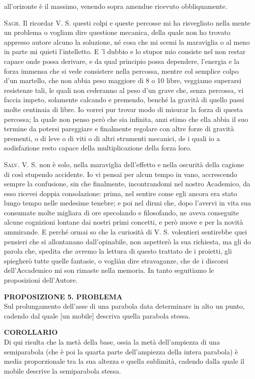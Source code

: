 \documentclass[11pt,twoside,openany]{book}
\newcommand{\speaker}[1]{\textcolor{rubric}{\textsc{#1}}\space}
\begin{document}
all'orizonte è il massimo, venendo sopra amendue ricevuto obbliquamente.

\speaker{Sagr.} Il ricordar V. S. questi colpi e queste percosse mi ha risvegliato nella mente un problema o vogliam dire questione mecanica, della quale non ho trovato appresso autore alcuno la soluzione, né cosa che mi scemi la maraviglia o al meno in parte mi quieti l'intelletto. E 'l dubbio e lo stupor mio consiste nel non restar capace onde possa derivare, e da qual principio possa dependere, l'energia e la forza immensa che si vede consistere nella percossa, mentre col semplice colpo d'un martello, che non abbia peso maggiore di 8 o 10 libre, veggiamo superarsi resistenze tali, le quali non cederanno al peso d'un grave che, senza percossa, vi faccia impeto, solamente calcando e premendo, benché la gravità di quello passi molte centinaia di libre. Io vorrei pur trovar modo di misurar la forza di questa percossa; la quale non penso però che sia infinita, anzi stimo che ella abbia il suo termine da potersi pareggiare e finalmente regolare con altre forze di gravità prementi, o di leve o di viti o di altri strumenti mecanici, de i quali io a sodisfazione resto capace della multiplicazione della forza loro.

\speaker{Salv.} V. S. non è solo, nella maraviglia dell'effetto e nella oscurità della cagione di così stupendo accidente. Io vi pensai per alcun tempo in vano, accrescendo sempre la confusione, sin che finalmente, incontrandomi nel nostro Academico, da esso ricevei doppia consolazione: prima, nel sentire come egli ancora era stato lungo tempo nelle medesime tenebre; e poi nel dirmi che, dopo l'avervi in vita sua consumate molte migliara di ore specolando e filosofando, ne aveva conseguite alcune cognizioni lontane dai nostri primi concetti, e però nuove e per la novità ammirande. E perché ormai so che la curiosità di V. S. volentieri sentirebbe quei pensieri che si allontanano dall'opinabile, non aspetterò la sua richiesta, ma gli do parola che, spedita che avremo la lettura di questo trattato de i proietti, gli spiegherò tutte quelle fantasie, o vogliàn dire stravaganze, che de i discorsi dell'Accademico mi son rimaste nella memoria. In tanto seguitiamo le proposizioni dell'Autore.

\textbf{PROPOSIZIONE 5. PROBLEMA}\\ Sul prolungamento dell'asse di una parabola data determinare in alto un punto, cadendo dal quale [un mobile] descriva quella parabola stessa.

\textbf{COROLLARIO}\\ Di qui risulta che la metà della base, ossia la metà dell'ampiezza di una semiparabola (che è poi la quarta parte dell'ampiezza della intera parabola) è media proporzionale tra la sua altezza e quella sublimità, cadendo dalla quale il mobile descrive la semiparabola stessa.
\end{document}
